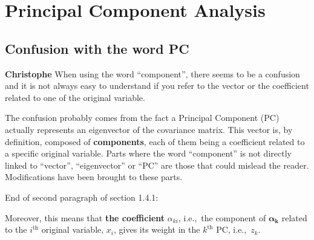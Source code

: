 \documentclass[12pt,a4paper]{article}
\def\ie{i.e.,\ }
\begin{document}
\section{Principal Component Analysis}
\label{PCA}

\subsection{Confusion with the word PC}
\label{Confusion_PC_wording}


\begin{mdframed}[style=comment] %
{\color{violet} \textbf{Christophe}} When using the word ``component'', there seems to be a confusion and it is not always easy to understand if you refer to the vector or the coefficient related to one of the original variable.
\end{mdframed}

\noindent The confusion probably comes from the fact a Principal Component (PC) actually represents an eigenvector of the covariance matrix. This vector is, by definition, composed of \textbf{components}, each of them being a coefficient related to a specific original variable. Parts where the word ``component'' is not directly linked to ``vector'', ``eigenvector'' or ``PC'' are those that could mislead the reader. Modifications have been brought to these parts.

{\color{blue} End of second paragraph of section 1.4.1}:

\begin{mdframed}[style=manuscript] %
Moreover, this means that \textbf{the coefficient} $\alpha_{ki}$, \ie the component of $\bm{\alpha}_{\mathbf{k}}$ related to the $i^{\text{th}}$ original variable, $x_i$,  gives its weight in the $k^{\text{th}}$ PC, \ie $z_k$. 
\end{mdframed}


\clearpage
\def\bibfont{\scriptsize}

\normalsize
\end{document}

